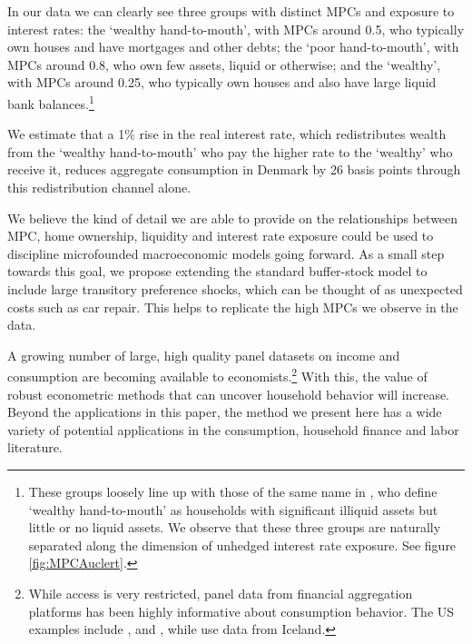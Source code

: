 \documentclass[titlepage]{\econtex}\newcommand{\texname}{ConsumptionHeterogeneity}
\begin{document}
In our data we can clearly see three groups with distinct MPCs and exposure to interest rates: the `wealthy hand-to-mouth', with MPCs around 0.5, who typically own houses and have mortgages and other debts; the `poor hand-to-mouth', with MPCs around 0.8, who own few assets, liquid or otherwise; and the `wealthy', with MPCs around 0.25, who typically own houses and also have large liquid bank balances.\footnote{These groups loosely line up with those of the same name in \cite{violante_wealthy_2014}, who define `wealthy hand-to-mouth' as households with significant illiquid assets but little or no liquid assets. We observe that these three groups are naturally separated along the dimension of unhedged interest rate exposure. See figure \ref{fig:MPCAuclert}.}

We estimate that a 1\% rise in the real interest rate, which redistributes wealth from the `wealthy hand-to-mouth' who pay the higher rate to the `wealthy' who receive it, reduces aggregate consumption in Denmark by 26 basis points through this redistribution channel alone. 

We believe the kind of detail we are able to provide on the relationships between MPC, home ownership, liquidity and interest rate exposure could be used to discipline microfounded macroeconomic models going forward. As a small step towards this goal, we propose extending the standard buffer-stock model to include large transitory preference shocks, which can be thought of as unexpected costs such as car repair. This helps to replicate the high MPCs we observe in the data. 

A growing number of large, high quality panel datasets on income and consumption are becoming available to economists.\footnote{While access is very restricted, panel data from financial aggregation platforms has been highly informative about consumption behavior. The US examples include \cite{gelman_harnessing_2014}, \cite{ganong_consumer_2017} and \cite{baker_debt_2015}, while \cite{vardardottir_liquid_2016} use data from Iceland.} With this, the value of robust econometric methods that can uncover household behavior will increase. Beyond the applications in this paper, the method we present here has a wide variety of potential applications in the consumption, household finance and labor literature.
\end{document}
